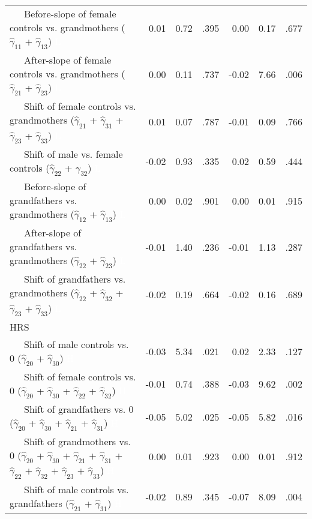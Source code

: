 \documentclass[
  english,
  man, noextraspace,floatsintext]{apa7}
\newenvironment{lltable}{\begin{landscape}\begin{center}\begin{ThreePartTable}}{\end{ThreePartTable}\end{center}\end{landscape}}
\begin{document}
\begin{appendix}
\begin{lltable}
{\begin{longtable}{lrrrrrr}
\ \ \ Before-slope of female controls vs. grandmothers 
($\hat{\gamma}_{11}$ + $\hat{\gamma}_{13}$) \textcolor{white}{L} & 0.01 & 0.72 & .395 & 0.00 & 0.17 & .677\\
\ \ \ After-slope of female controls vs. grandmothers 
($\hat{\gamma}_{21}$ + $\hat{\gamma}_{23}$) \textcolor{white}{L} & 0.00 & 0.11 & .737 & -0.02 & 7.66 & .006\\
\ \ \ Shift of female controls vs. grandmothers 
($\hat{\gamma}_{21}$ + $\hat{\gamma}_{31}$ + 
$\hat{\gamma}_{23}$ + $\hat{\gamma}_{33}$) \textcolor{white}{L} & 0.01 & 0.07 & .787 & -0.01 & 0.09 & .766\\
\ \ \ Shift of male vs. female controls 
($\hat{\gamma}_{22}$ + $\hat{\gamma}_{32}$) \textcolor{white}{L} & -0.02 & 0.93 & .335 & 0.02 & 0.59 & .444\\
\ \ \ Before-slope of grandfathers vs. grandmothers 
($\hat{\gamma}_{12}$ + $\hat{\gamma}_{13}$) \textcolor{white}{L} & 0.00 & 0.02 & .901 & 0.00 & 0.01 & .915\\
\ \ \ After-slope of grandfathers vs. grandmothers 
($\hat{\gamma}_{22}$ + $\hat{\gamma}_{23}$) \textcolor{white}{L} & -0.01 & 1.40 & .236 & -0.01 & 1.13 & .287\\
\ \ \ Shift of grandfathers vs. grandmothers 
($\hat{\gamma}_{22}$ + $\hat{\gamma}_{32}$ + 
$\hat{\gamma}_{23}$ + $\hat{\gamma}_{33}$) \textcolor{white}{L} & -0.02 & 0.19 & .664 & -0.02 & 0.16 & .689\\
HRS &  &  &  &  &  & \\
\ \ \ Shift of male controls vs. 0 ($\hat{\gamma}_{20}$ + 
$\hat{\gamma}_{30}$) \textcolor{white}{H} & -0.03 & 5.34 & .021 & 0.02 & 2.33 & .127\\
\ \ \ Shift of female controls vs. 0 ($\hat{\gamma}_{20}$ + 
$\hat{\gamma}_{30}$ + $\hat{\gamma}_{22}$ + 
$\hat{\gamma}_{32}$) \textcolor{white}{H} & -0.01 & 0.74 & .388 & -0.03 & 9.62 & .002\\
\ \ \ Shift of grandfathers vs. 0 ($\hat{\gamma}_{20}$ + 
$\hat{\gamma}_{30}$ + $\hat{\gamma}_{21}$ + 
$\hat{\gamma}_{31}$) \textcolor{white}{H} & -0.05 & 5.02 & .025 & -0.05 & 5.82 & .016\\
\ \ \ Shift of grandmothers vs. 0 ($\hat{\gamma}_{20}$ + 
$\hat{\gamma}_{30}$ + $\hat{\gamma}_{21}$ + 
$\hat{\gamma}_{31}$ + $\hat{\gamma}_{22}$ + 
$\hat{\gamma}_{32}$ + $\hat{\gamma}_{23}$ +
$\hat{\gamma}_{33}$) \textcolor{white}{H} & 0.00 & 0.01 & .923 & 0.00 & 0.01 & .912\\
\ \ \ Shift of male controls vs. grandfathers 
($\hat{\gamma}_{21}$ + $\hat{\gamma}_{31}$) \textcolor{white}{H} & -0.02 & 0.89 & .345 & -0.07 & 8.09 & .004\\

\end{longtable}}
\end{lltable}
\end{appendix}
\end{document}
